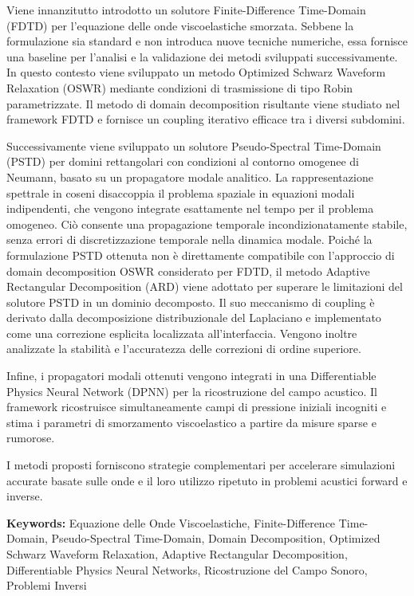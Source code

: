 \documentclass{Configuration_Files/PoliMi3i_thesis}
\begin{document}
Viene innanzitutto introdotto un solutore Finite-Difference Time-Domain
(FDTD) per l'equazione delle onde viscoelastiche smorzata. Sebbene la
formulazione sia standard e non introduca nuove tecniche numeriche,
essa fornisce una baseline per l'analisi e la validazione dei metodi
sviluppati successivamente. In questo contesto viene sviluppato un
metodo Optimized Schwarz Waveform Relaxation (OSWR) mediante
condizioni di trasmissione di tipo Robin parametrizzate. Il metodo di
domain decomposition risultante viene studiato nel framework FDTD e
fornisce un coupling iterativo efficace tra i diversi subdomini.

Successivamente viene sviluppato un solutore Pseudo-Spectral
Time-Domain (PSTD) per domini rettangolari con condizioni al contorno
omogenee di Neumann, basato su un propagatore modale analitico. La
rappresentazione spettrale in coseni disaccoppia il problema spaziale
in equazioni modali indipendenti, che vengono integrate esattamente nel
tempo per il problema omogeneo. Ciò consente una propagazione temporale
incondizionatamente stabile, senza errori di discretizzazione
temporale nella dinamica modale. Poiché la formulazione PSTD ottenuta
non è direttamente compatibile con l'approccio di domain decomposition
OSWR considerato per FDTD, il metodo Adaptive Rectangular Decomposition
(ARD) viene adottato per superare le limitazioni del solutore PSTD in
un dominio decomposto. Il suo meccanismo di coupling è derivato dalla
decomposizione distribuzionale del Laplaciano e implementato come una
correzione esplicita localizzata all'interfaccia. Vengono inoltre
analizzate la stabilità e l'accuratezza delle correzioni di ordine
superiore.

Infine, i propagatori modali ottenuti vengono integrati in una
Differentiable Physics Neural Network (DPNN) per la ricostruzione del
campo acustico. Il framework ricostruisce simultaneamente campi di
pressione iniziali incogniti e stima i parametri di smorzamento
viscoelastico a partire da misure sparse e rumorose.

I metodi proposti forniscono strategie complementari per accelerare
simulazioni accurate basate sulle onde e il loro utilizzo ripetuto in
problemi acustici forward e inverse.

\textbf{Keywords:} Equazione delle Onde Viscoelastiche, Finite-Difference
Time-Domain, Pseudo-Spectral Time-Domain, Domain Decomposition,
Optimized Schwarz Waveform Relaxation, Adaptive Rectangular
Decomposition, Differentiable Physics Neural Networks, Ricostruzione
del Campo Sonoro, Problemi Inversi
\end{document}
